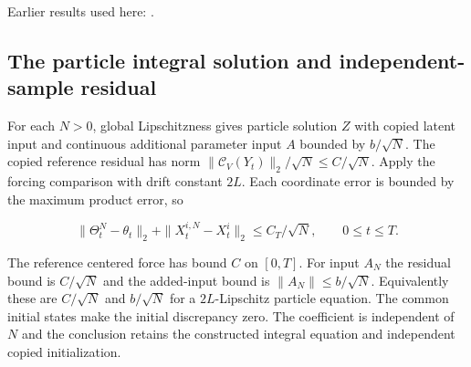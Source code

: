 \documentclass[11pt,a4paper]{report}
\begin{document}
Earlier results used here: \cite[Section~3.1.1]{LangevinLean2026IPLA}.
\subsection{\texorpdfstring{The particle integral solution and independent-sample residual}{The particle integral solution and independent-sample residual}}
\label{report-step-ProximalLangevin-MeanFieldParticles-lean-3}


For each \(N>0\), global Lipschitzness gives particle solution \(Z\) with copied latent input and continuous additional parameter input \(A\) bounded by \(b/\sqrt N\). The copied reference residual has norm \(\|\mathcal C_V(Y_t)\|_2/\sqrt N\le C/\sqrt N\). Apply the forcing comparison with drift constant \(2L\). Each coordinate error is bounded by the maximum product error, so

\[\|\Theta_t^N-\theta_t\|_2+\|X_t^{i,N}-X_t^i\|_2\le C_T/\sqrt N,\qquad0\le t\le T.\]

The reference centered force has bound \(C\) on \([0,T]\). For input \(A_N\) the residual bound is \(C/\sqrt N\) and the added-input bound is \(\|A_N\|\le b/\sqrt N\). Equivalently these are \(C/\sqrt N\) and \(b/\sqrt N\) for a \(2L\)-Lipschitz particle equation. The common initial states make the initial discrepancy zero. The coefficient is independent of \(N\) and the conclusion retains the constructed integral equation and independent copied initialization.
\end{document}
